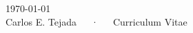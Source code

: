 \documentclass[11pt, a4paper]{awesome-cv}
\begin{document}
  \makecvheader
  \makecvfooter
    {\today\\}
    {Carlos E. Tejada~~~·~~~Curriculum Vitae}
    {\thepage}

  
  
  
  
  
\end{document}
